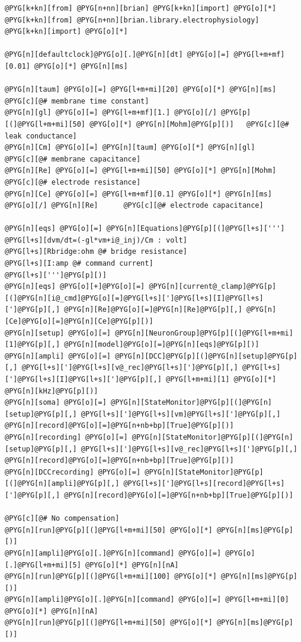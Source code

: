 \documentclass[letterpaper,10pt,english]{manual}
\begin{document}
\begin{Verbatim}[commandchars=@\[\]]
@PYG[k+kn][from] @PYG[n+nn][brian] @PYG[k+kn][import] @PYG[o][*]
@PYG[k+kn][from] @PYG[n+nn][brian.library.electrophysiology] @PYG[k+kn][import] @PYG[o][*]

@PYG[n][defaultclock]@PYG[o][.]@PYG[n][dt] @PYG[o][=] @PYG[l+m+mf][0.01] @PYG[o][*] @PYG[n][ms]

@PYG[n][taum] @PYG[o][=] @PYG[l+m+mi][20] @PYG[o][*] @PYG[n][ms]        @PYG[c][@# membrane time constant]
@PYG[n][gl] @PYG[o][=] @PYG[l+m+mf][1.] @PYG[o][/] @PYG[p][(]@PYG[l+m+mi][50] @PYG[o][*] @PYG[n][Mohm]@PYG[p][)]   @PYG[c][@# leak conductance]
@PYG[n][Cm] @PYG[o][=] @PYG[n][taum] @PYG[o][*] @PYG[n][gl]        @PYG[c][@# membrane capacitance]
@PYG[n][Re] @PYG[o][=] @PYG[l+m+mi][50] @PYG[o][*] @PYG[n][Mohm]        @PYG[c][@# electrode resistance]
@PYG[n][Ce] @PYG[o][=] @PYG[l+m+mf][0.1] @PYG[o][*] @PYG[n][ms] @PYG[o][/] @PYG[n][Re]      @PYG[c][@# electrode capacitance]

@PYG[n][eqs] @PYG[o][=] @PYG[n][Equations]@PYG[p][(]@PYG[l+s][''']
@PYG[l+s][dvm/dt=(-gl*vm+i@_inj)/Cm : volt]
@PYG[l+s][Rbridge:ohm @# bridge resistance]
@PYG[l+s][I:amp @# command current]
@PYG[l+s][''']@PYG[p][)]
@PYG[n][eqs] @PYG[o][+]@PYG[o][=] @PYG[n][current@_clamp]@PYG[p][(]@PYG[n][i@_cmd]@PYG[o][=]@PYG[l+s][']@PYG[l+s][I]@PYG[l+s][']@PYG[p][,] @PYG[n][Re]@PYG[o][=]@PYG[n][Re]@PYG[p][,] @PYG[n][Ce]@PYG[o][=]@PYG[n][Ce]@PYG[p][)]
@PYG[n][setup] @PYG[o][=] @PYG[n][NeuronGroup]@PYG[p][(]@PYG[l+m+mi][1]@PYG[p][,] @PYG[n][model]@PYG[o][=]@PYG[n][eqs]@PYG[p][)]
@PYG[n][ampli] @PYG[o][=] @PYG[n][DCC]@PYG[p][(]@PYG[n][setup]@PYG[p][,] @PYG[l+s][']@PYG[l+s][v@_rec]@PYG[l+s][']@PYG[p][,] @PYG[l+s][']@PYG[l+s][I]@PYG[l+s][']@PYG[p][,] @PYG[l+m+mi][1] @PYG[o][*] @PYG[n][kHz]@PYG[p][)]
@PYG[n][soma] @PYG[o][=] @PYG[n][StateMonitor]@PYG[p][(]@PYG[n][setup]@PYG[p][,] @PYG[l+s][']@PYG[l+s][vm]@PYG[l+s][']@PYG[p][,] @PYG[n][record]@PYG[o][=]@PYG[n+nb+bp][True]@PYG[p][)]
@PYG[n][recording] @PYG[o][=] @PYG[n][StateMonitor]@PYG[p][(]@PYG[n][setup]@PYG[p][,] @PYG[l+s][']@PYG[l+s][v@_rec]@PYG[l+s][']@PYG[p][,] @PYG[n][record]@PYG[o][=]@PYG[n+nb+bp][True]@PYG[p][)]
@PYG[n][DCCrecording] @PYG[o][=] @PYG[n][StateMonitor]@PYG[p][(]@PYG[n][ampli]@PYG[p][,] @PYG[l+s][']@PYG[l+s][record]@PYG[l+s][']@PYG[p][,] @PYG[n][record]@PYG[o][=]@PYG[n+nb+bp][True]@PYG[p][)]

@PYG[c][@# No compensation]
@PYG[n][run]@PYG[p][(]@PYG[l+m+mi][50] @PYG[o][*] @PYG[n][ms]@PYG[p][)]
@PYG[n][ampli]@PYG[o][.]@PYG[n][command] @PYG[o][=] @PYG[o][.]@PYG[l+m+mi][5] @PYG[o][*] @PYG[n][nA]
@PYG[n][run]@PYG[p][(]@PYG[l+m+mi][100] @PYG[o][*] @PYG[n][ms]@PYG[p][)]
@PYG[n][ampli]@PYG[o][.]@PYG[n][command] @PYG[o][=] @PYG[l+m+mi][0] @PYG[o][*] @PYG[n][nA]
@PYG[n][run]@PYG[p][(]@PYG[l+m+mi][50] @PYG[o][*] @PYG[n][ms]@PYG[p][)]


\end{Verbatim}
\end{document}
